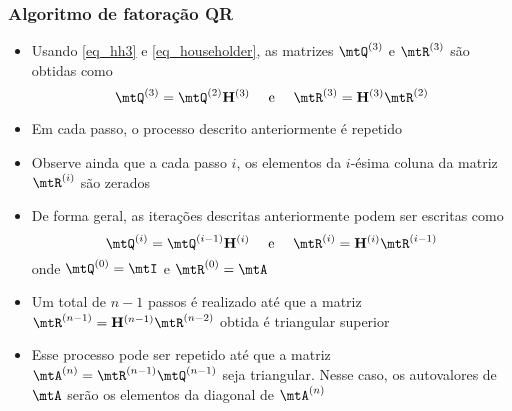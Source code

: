\begin{frame}
  \frametitle{Algoritmo de fatoração QR}
  \begin{itemize}
    \item Usando \eqref{eq_hh3} e \eqref{eq_householder}, as matrizes $\mtQ^{(3)}$ e $\mtR^{(3)}$ são obtidas como
    \begin{equation}
      \mtQ^{(3)} = \mtQ^{(2)}\mathbf{H}^{(3)} \quad \text{ e } \quad  \mtR^{(3)} = \mathbf{H}^{(3)}\mtR^{(2)}
    \end{equation}
    \item Em cada passo, o processo descrito anteriormente é repetido
    \item Observe ainda que a cada passo $i$, os elementos da $i$-ésima coluna da matriz $\mtR^{(i)}$ são zerados
    \item De forma geral, as iterações descritas anteriormente podem ser escritas como
    \begin{equation}
      \mtQ^{(i)} = \mtQ^{(i-1)}\mathbf{H}^{(i)} \quad \text{ e } \quad  \mtR^{(i)} = \mathbf{H}^{(i)}\mtR^{(i-1)}
    \end{equation}
    onde $\mtQ^{(0)} = \mtI$ e $\mtR^{(0)} = \mtA$
    \item Um total de $n-1$ passos é realizado até que a matriz $\mtR^{(n-1)} = \mathbf{H}^{(n-1)}\mtR^{(n-2)}$ obtida é triangular superior
    \item Esse processo pode ser repetido até que a matriz $ \mtA^{(n)} = \mtR^{(n-1)}\mtQ^{(n-1)} $ seja triangular. Nesse caso, os autovalores de $ \mtA $ serão os elementos da diagonal de $ \mtA^{(n)} $
  \end{itemize}
\end{frame}

